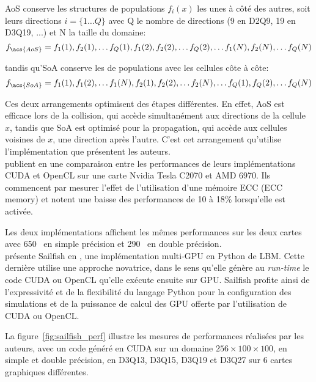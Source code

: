 \acs{AoS} conserve les structures de populations $f_i(x)$ les unes à côté des autres, soit leurs directions $i = \{1\dots Q\}$ avec Q le nombre de directions (9 en D2Q9, 19 en D3Q19, ...) et N la taille du domaine:
\begin{equation*}
f_{\acs{AoS}} = f_1(1), f_2(1), \dots f_Q(1), f_1(2), f_2(2), \dots f_Q(2), \dots f_1(N), f_2(N), \dots f_Q(N)
\end{equation*}

\noindent tandis qu'\acs{SoA} conserve les  de populations avec les cellules côte à côte:
\begin{equation*}
f_{\acs{SoA}} = f_1(1), f_1(2), \dots f_1(N), f_2(1), f_2(2), \dots f_2(N), \dots f_Q(1), f_Q(2), \dots f_Q(N)
\end{equation*}

Ces deux arrangements optimisent des étapes différentes. En effet, \acs{AoS} est efficace lors de la collision, qui accède simultanément aux directions de la cellule $x$, tandis que \acs{SoA} est optimisé pour la propagation, qui accède aux cellules voisines de $x$, une direction après l'autre. C'est cet arrangement qu'utilise l'implémentation que présentent les auteurs.\\

\citet{habich_performance_2013} publient en \citeyear{habich_performance_2013} une comparaison entre les performances de leurs implémentations CUDA et OpenCL sur une carte Nvidia Tesla C2070 et AMD 6970. Ils commencent par mesurer l'effet de l'utilisation d'une mémoire \acs{ECC} (\acl{ECC} memory) et notent une baisse des performances de 10 à 18\% lorsqu'elle est activée.

Les deux implémentations affichent les mêmes performances sur les deux cartes avec 650~ en simple précision et 290~ en double précision.\\

\citet{januszewski_sailfish_2014} présente Sailfish en \citeyear{januszewski_sailfish_2014}, une implémentation multi-\acs{GPU} en Python de \acs{LBM}. Cette dernière utilise une approche novatrice, dans le sens qu'elle génère au \textit{run-time} le code CUDA ou OpenCL qu'elle exécute ensuite sur \acs{GPU}. Sailfish profite ainsi de l'expressivité et de la flexibilité du langage Python pour la configuration des simulations et de la puissance de calcul des \acs{GPU} offerte par l'utilisation de CUDA ou OpenCL.

La figure~\ref{fig:sailfish_perf} illustre les mesures de performances réalisées par les auteurs, avec un code généré en CUDA sur un domaine $256 \times 100\times 100$, en simple et double précision, en D3Q13, D3Q15, D3Q19 et D3Q27 sur 6 cartes graphiques différentes.


